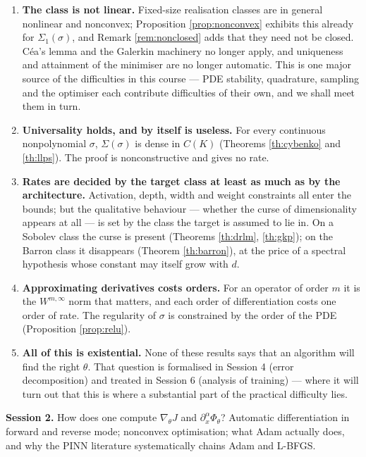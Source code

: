 \documentclass[11pt,a4paper]{article}
\begin{document}
\begin{keybox}
\begin{enumerate}[label=\textbf{\arabic*.}, leftmargin=*]
\item \textbf{The class is not linear.} Fixed-size realisation classes are in general nonlinear and
nonconvex; Proposition \ref{prop:nonconvex} exhibits this already for $\Sigma_1(\sigma)$, and
Remark \ref{rem:nonclosed} adds that they need not be closed. Céa's lemma and the Galerkin machinery
no longer apply, and uniqueness and attainment of the minimiser are no longer automatic. This is one
major source of the difficulties in this course --- PDE stability, quadrature, sampling and the
optimiser each contribute difficulties of their own, and we shall meet them in turn.
\item \textbf{Universality holds, and by itself is useless.} For every continuous nonpolynomial
$\sigma$, $\Sigma(\sigma)$ is dense in $C(K)$ (Theorems \ref{th:cybenko} and \ref{th:llps}). The
proof is nonconstructive and gives no rate.
\item \textbf{Rates are decided by the target class at least as much as by the architecture.}
Activation, depth, width and weight constraints all enter the bounds; but the qualitative behaviour
--- whether the curse of dimensionality appears at all --- is set by the class the target is assumed
to lie in. On a Sobolev class the curse is present (Theorems \ref{th:drlm}, \ref{th:gkp}); on the
Barron class it disappears (Theorem \ref{th:barron}), at the price of a spectral hypothesis whose
constant may itself grow with $d$.
\item \textbf{Approximating derivatives costs orders.} For an operator of order $m$ it is the
$W^{m,\infty}$ norm that matters, and each order of differentiation costs one order of rate. The
regularity of $\sigma$ is constrained by the order of the PDE (Proposition \ref{prop:relu}).
\item \textbf{All of this is existential.} None of these results says that an algorithm will find
the right $\theta$. That question is formalised in Session 4 (error decomposition) and treated in
Session 6 (analysis of training) --- where it will turn out that this is where a substantial part of
the practical difficulty lies.
\end{enumerate}
\end{keybox}

\medskip
\noindent
\textbf{Session 2.} How does one compute $\nabla_\theta J$ and $\partial^\alpha_x \Phi_\theta$?
Automatic differentiation in forward and reverse mode; nonconvex optimisation; what Adam actually
does, and why the PINN literature systematically chains Adam and L-BFGS.
\end{document}
